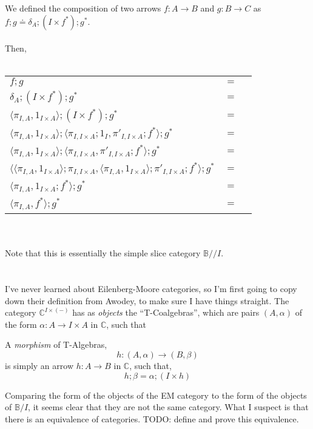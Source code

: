 \documentclass{article}
\begin{document}
We defined the composition of two arrows $f : A \to B$ and $g : B \to C$ as
$f;g \doteq \delta_{A};(I \times f^*);g^*$.\\~\\
Then,\\~\\
\begin{tabular}{lll}
$f;g$ & $=$ & \\
$\delta_{A};(I \times f^*);g^*$ & $=$ & \\
$\langle \pi_{I,A}, 1_{I \times A} \rangle;(I \times f^*);g^*$ & $=$ & \\
$\langle \pi_{I,A}, 1_{I \times A} \rangle;\langle \pi_{I, I \times A};1_I, \pi'_{I, I \times A};f^* \rangle;g^*$ & $=$ & \\
$\langle \pi_{I,A}, 1_{I \times A} \rangle;\langle \pi_{I, I \times A}, \pi'_{I, I \times A};f^* \rangle;g^*$ & $=$ & \\
$\langle \langle \pi_{I,A}, 1_{I \times A} \rangle;\pi_{I, I \times A}, \langle \pi_{I,A}, 1_{I \times A} \rangle;\pi'_{I, I \times A};f^* \rangle;g^*$ & $=$ & \\
$\langle \pi_{I,A}, 1_{I \times A};f^* \rangle;g^*$ & $=$ & \\

$\langle \pi_{I,A}, f^* \rangle;g^*$ & $=$ & \\
\end{tabular}\\~\\
Note that this is essentially the simple slice category $\mathbb B / \! / I$.
\\~\\~\\
I've never learned about Eilenberg-Moore categories, so I'm first going to copy down their definition from
Awodey, to make sure I have things straight. The category $\mathbb C^{I \times (-)}$ has as \emph{objects}
the ``T-Coalgebras'', which are pairs $(A,\alpha)$ of the form $\alpha : A \to I \times A$ in $\mathbb C$,
such that
A \emph{morphism} of T-Algebras,
$$ h : (A,\alpha) \to (B,\beta) $$
is simply an arrow $h : A \to B$ in $\mathbb C$, such that, 
$$h;\beta = \alpha;(I \times h)$$

Comparing the form of the objects of the EM category to the form of the objects of $\mathbb B / I$,
it seems clear that they are not the same category. What I suspect is that there is an equivalence of
categories. TODO: define and prove this equivalence.
\end{document}
